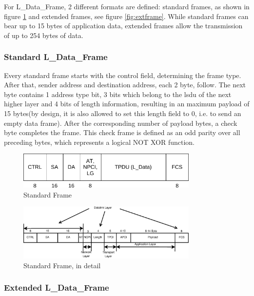For L\_Data\_Frame, 2 different formats are defined: standard frames, as shown in figure \ref{fig:stdframe} and extended frames, see figure \ref{fig:extframe}.
While standard frames can bear up to
15 bytes of application data, extended frames allow the transmission of up to 254 bytes of data.

\subsubsection{Standard L\_Data\_Frame}

Every standard frame starts with the control field, determining the frame type. 
After that, sender address and destination address, each 2 byte, follow.
The next byte contains 1 address type bit, 3 bits which belong to the \gls{lsdu} of the next higher layer
and 4 bits of length information, resulting in an maximum payload of 15 bytes(by design, it is also allowed to set this length
field to 0, i.e. to send an empty data frame). After the corresponding number of payload bytes, a check byte completes the frame. This check
frame is defined as an odd parity over all preceding bytes, which represents a logical NOT XOR function. 

\begin{figure}
    \centering
    \includegraphics[width=0.8\textwidth]{figures/standardframe}
    \caption{Standard Frame}
    \label{fig:stdframe}
\end{figure}

\begin{figure}
    \centering
    \includegraphics[width=0.8\textwidth]{figures/standardFrame.eps}
    \caption{Standard Frame, in detail}
    \label{fig:stdFrameDetail}
\end{figure}


\subsubsection{Extended L\_Data\_Frame}

